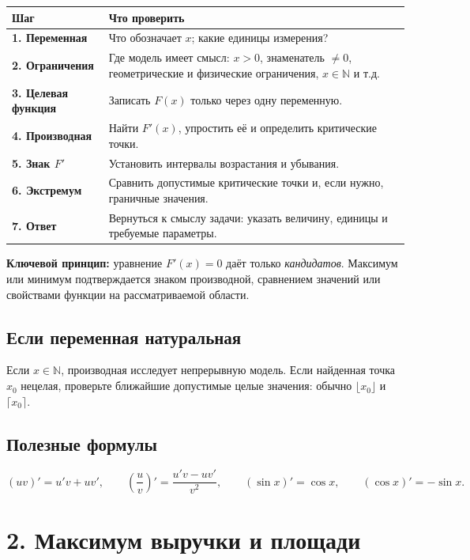 \documentclass[a4paper,12pt]{article}
\newcommand{\important}[1]{\textcolor{warn}{\textbf{#1}}}
\newcommand{\N}{\mathbb{N}}
\begin{document}
\begin{center}
\begin{tabularx}{0.95\linewidth}{@{}>{\bfseries}l X@{}}
\toprule
Шаг & Что проверить \\
\midrule
1. Переменная & Что обозначает \(x\); какие единицы измерения? \\
2. Ограничения & Где модель имеет смысл: \(x>0\), знаменатель \(\ne0\), геометрические и физические ограничения, \(x\in\N\) и т.д. \\
3. Целевая функция & Записать \(F(x)\) только через одну переменную. \\
4. Производная & Найти \(F'(x)\), упростить её и определить критические точки. \\
5. Знак \(F'\) & Установить интервалы возрастания и убывания. \\
6. Экстремум & Сравнить допустимые критические точки и, если нужно, граничные значения. \\
7. Ответ & Вернуться к смыслу задачи: указать величину, единицы и требуемые параметры. \\
\bottomrule
\end{tabularx}
\end{center}

\important{Ключевой принцип:} уравнение \(F'(x)=0\) даёт только \emph{кандидатов}. Максимум или минимум подтверждается знаком производной, сравнением значений или свойствами функции на рассматриваемой области.

\subsection*{Если переменная натуральная}
Если \(x\in\N\), производная исследует непрерывную модель. Если найденная точка \(x_0\) нецелая, проверьте ближайшие допустимые целые значения: обычно \(\lfloor x_0\rfloor\) и \(\lceil x_0\rceil\).

\subsection*{Полезные формулы}
\[
(uv)'=u'v+uv',\qquad
\left(\frac{u}{v}\right)'=\frac{u'v-uv'}{v^2},\qquad
(\sin x)'=\cos x,\qquad (\cos x)'=-\sin x.
\]

\clearpage

\section*{2. Максимум выручки и площади}
\end{document}
